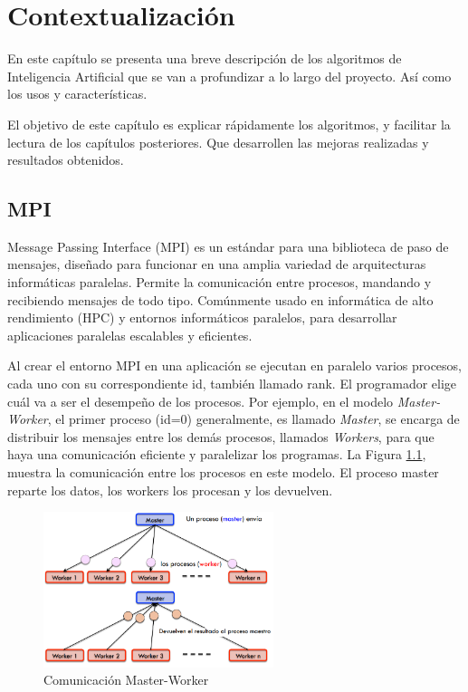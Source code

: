 \chapter{Contextualización}
\label{cap:c2_context}



En este capítulo se presenta una breve descripción de los algoritmos de Inteligencia Artificial que se van a profundizar a lo largo del proyecto. Así como los usos y características. 

El objetivo de este capítulo es explicar rápidamente los algoritmos, y facilitar la lectura de los capítulos posteriores. Que desarrollen las mejoras realizadas y resultados obtenidos.



\section{MPI}

Message Passing Interface\cite{barker2015message}  (MPI)  es un estándar para una biblioteca de paso de mensajes, diseñado para funcionar en una amplia variedad de arquitecturas informáticas paralelas. Permite la comunicación entre procesos, mandando y recibiendo mensajes de todo tipo. Comúnmente usado en informática de alto rendimiento\cite{stone1990high} (HPC) y entornos informáticos paralelos, para desarrollar aplicaciones paralelas escalables y eficientes.


Al crear el entorno MPI en una aplicación se ejecutan en paralelo varios procesos, cada uno con su correspondiente id, también llamado rank. El programador elige cuál va a ser el desempeño de los procesos. Por ejemplo, en el modelo \textit{Master-Worker}, el primer proceso (id=0) generalmente, es llamado \textit{Master}, se encarga de distribuir los mensajes entre los demás procesos, llamados \textit{Workers}, para que haya una comunicación eficiente y paralelizar los programas. La Figura \ref{fig:comunicacion_mw}, muestra la comunicación entre los procesos en este modelo. El proceso master reparte los datos, los workers los procesan y los devuelven.


\begin{figure}[!h]
	\centering
	\includegraphics[width=0.6\textwidth]{images/chapter_2/mpi_1}
	\caption{Comunicación Master-Worker}
	\label{fig:comunicacion_mw}
\end{figure}

